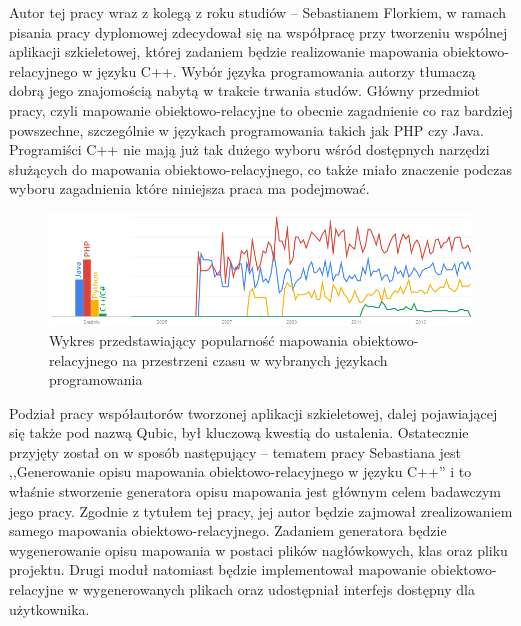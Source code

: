 \documentclass[12pt]{report}
\begin{document}
Autor tej pracy wraz z kolegą z roku studiów -- Sebastianem Florkiem, w ramach pisania pracy dyplomowej zdecydował się na współpracę przy tworzeniu wspólnej aplikacji
szkieletowej, której zadaniem będzie realizowanie mapowania obiektowo-relacyjnego w języku C++. Wybór języka programowania autorzy tłumaczą dobrą jego 
znajomością nabytą w trakcie trwania studów. Główny przedmiot pracy, czyli mapowanie obiektowo-relacyjne to obecnie zagadnienie co raz bardziej powszechne, 
szczególnie w językach programowania takich jak PHP czy Java. Programiści C++ nie mają już tak dużego wyboru wśród dostępnych narzędzi służących do mapowania 
obiektowo-relacyjnego, co także miało znaczenie podczas wyboru zagadnienia które niniejsza praca ma podejmować.

\begin{figure}[H]
\centering
\includegraphics[width=\textwidth]{resources/trends.png}
\caption[Wykres przedstawiający popularność mapowania obiektowo-relacyjnego na przestrzeni czasu w wybranych językach programowania] {Wykres przedstawiający 
popularność mapowania obiektowo-relacyjnego na przestrzeni czasu w wybranych językach programowania \cite{trends}}
\end{figure}

Podział pracy współautorów tworzonej aplikacji szkieletowej, dalej pojawiającej się także pod nazwą Qubic, był kluczową kwestią do ustalenia. Ostatecznie przyjęty został
on w sposób następujący -- tematem pracy Sebastiana jest ,,Generowanie opisu mapowania obiektowo-relacyjnego w języku C++'' i to właśnie stworzenie generatora opisu
mapowania jest głównym celem badawczym jego pracy. Zgodnie z tytułem tej pracy, jej autor będzie zajmował zrealizowaniem samego mapowania obiektowo-relacyjnego.
Zadaniem generatora będzie wygenerowanie opisu mapowania w postaci plików nagłówkowych, klas oraz pliku projektu. Drugi moduł natomiast będzie implementował 
mapowanie obiektowo-relacyjne w wygenerowanych plikach oraz udostępniał interfejs dostępny dla użytkownika.
\end{document}
